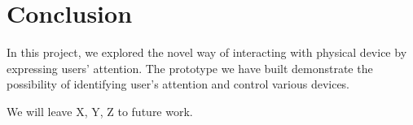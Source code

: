 
\section{Conclusion}
\label{sec:conclusion}

In this project, we explored the novel way of interacting with physical device by expressing users' attention. The prototype we have built demonstrate the possibility of identifying user's attention and control various devices. 

We will leave X, Y, Z to future work.

